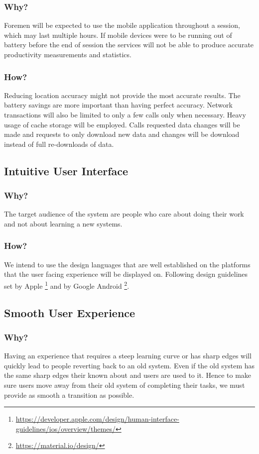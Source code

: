 \documentclass[11pt]{article}
\begin{document}
\subsubsection{Why?}
Foremen will be expected to use the mobile application throughout a session, which may last multiple hours. If mobile devices were to be running out of battery before the end of session the services will not be able to produce accurate productivity measurements and statistics.

\subsubsection{How?}
Reducing location accuracy might not provide the most accurate results. The battery savings are more important than having perfect accuracy. Network transactions will also be limited to only a few calls only when necessary. Heavy usage of cache storage will be employed. Calls requested data changes will be made and requests to only download new data and changes will be download instead of full re-downloads of data.

\subsection{Intuitive User Interface}

\subsubsection{Why?}
The target audience of the system are people who care about doing their work and not about learning a new systems.

\subsubsection{How?}
We intend to use the design languages that are well established on the platforms that the user facing experience will be displayed on. Following design guidelines set by Apple \footnote{\url{https://developer.apple.com/design/human-interface-guidelines/ios/overview/themes/}} and by Google Android \footnote{\url{https://material.io/design/}}.

\subsection{Smooth User Experience}

\subsubsection{Why?}
Having an experience that requires a steep learning curve or has sharp edges will quickly lead to people reverting back to an old system. Even if the old system has the same sharp edges their known about and users are used to it. Hence to make sure users move away from their old system of completing their tasks, we must provide as smooth a transition as possible.
\end{document}
